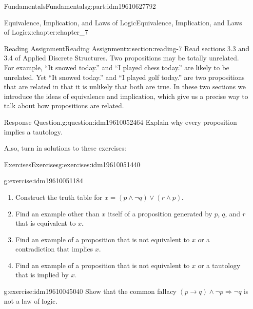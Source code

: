 \documentclass[oneside,10pt,]{book}
\numberwithin{equation}{section}
\begin{document}
\begin{partptx}{Fundamentals}{}{Fundamentals}{}{}{g:part:idm19610627792}
\begin{chapterptx}{Equivalence, Implication, and Laws of Logic}{}{Equivalence, Implication, and Laws of Logic}{}{}{x:chapter:chapter_7}
\begin{sectionptx}{Reading Assignment}{}{Reading Assignment}{}{}{x:section:reading-7}
Read sections 3.3 and 3.4 of Applied Discrete Structures. Two propositions may be totally unrelated.  For example, ``It snowed today.'' and ``I played chess today.'' are likely to be unrelated.  Yet ``It snowed today.'' and ``I played golf today.'' are two propositions that are related in that it is unlikely that both are true.  In these two sections we introduce the ideas of equivalence and implication, which give us a precise way to talk about how propositions are related.%
\begin{question}{Response Question.}{g:question:idm19610052464}%
Explain why every proposition implies a tautology.%
\end{question}
Also, turn in solutions to these exercises:%
%
%
\typeout{************************************************}
\typeout{************************************************}
%
\begin{exercises-subsection-numberless}{Exercises}{}{Exercises}{}{}{g:exercises:idm19610051440}
\par\medskip\noindent%
%
\begin{exercisegroup}
\begin{divisionexerciseeg}{1}{}{}{g:exercise:idm19610051184}%
%
\begin{enumerate}[label=(\alph*)]
\item{}Construct the truth table for \(x= (p \land  \neg q) \lor  (r \land  p)\).%
\item{}Find an example other than \(x\) itself of a proposition generated by \(p\), \(q\), and \(r\) that is equivalent to \(x\).%
\item{}Find an example of a proposition that is not equivalent to \(x\) or a contradiction  that implies \(x\).%
\item{}Find an example of a proposition that is not equivalent to \(x\) or a tautology that is implied by \(x\).%
\end{enumerate}
%
\end{divisionexerciseeg}%
\begin{divisionexerciseeg}{2}{}{}{g:exercise:idm19610045040}%
Show that the common fallacy \((p\to  q) \land  \neg p \Rightarrow  \neg q\) is not a law of logic.%
\end{divisionexerciseeg}%
\end{exercisegroup}
\par\medskip\noindent
\end{exercises-subsection-numberless}
\end{sectionptx}
%
%
\typeout{************************************************}

\end{chapterptx}
\end{partptx}
\end{document}
